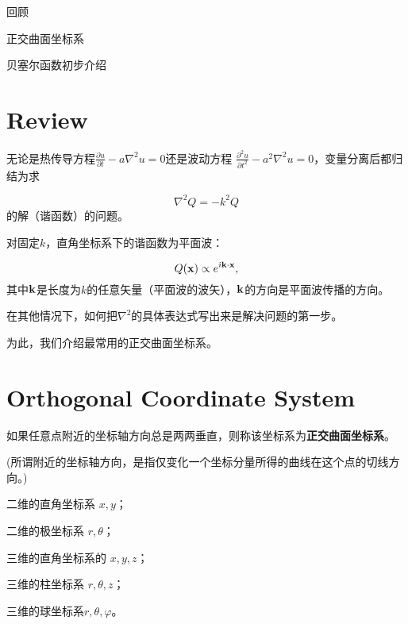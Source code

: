 \documentclass[CJK]{beamer}
\date{}
\begin{document}

\begin{frame}
\bch
\bitem
\item{回顾}
\item{正交曲面坐标系}
\item{贝塞尔函数初步介绍}    
\eitem
\ech
\end{frame}

\section{Review}


\begin{frame}
\bch
无论是热传导方程$\frac{\partial u}{\partial t} -a \nabla^2u = 0$还是波动方程
$\frac{\partial^2u }{\partial t^2} - a^2 \nabla^2 u = 0$，变量分离后都归结为求

$$ \nabla^2 Q = - k ^2 Q $$
的解（谐函数）的问题。

\ech
\end{frame}


\begin{frame}
\bch
对固定$k$，直角坐标系下的谐函数为平面波：

$$Q({\mathbf{x}}) \propto e^{{\dot{\imath}} {\mathbf{k}}\cdot {\mathbf{x}}}, $$
其中${\mathbf{k}}$是长度为$k$的任意矢量（平面波的波矢），${\mathbf{k}}$的方向是平面波传播的方向。
\ech
\end{frame}


\begin{frame}
\bch
在其他情况下，如何把$\nabla^2$的具体表达式写出来是解决问题的第一步。

\skiplines

为此，我们介绍最常用的正交曲面坐标系。
\ech
\end{frame}


\section{Orthogonal Coordinate System}



\begin{frame}
\bch
如果任意点附近的坐标轴方向总是两两垂直，则称该坐标系为{\blue \bf 正交曲面坐标系}。

\skiplines
(所谓附近的坐标轴方向，是指仅变化一个坐标分量所得的曲线在这个点的切线方向。)

\skiplines
\bex
二维的直角坐标系 $x, y$；

二维的极坐标系 $r, \theta$；

三维的直角坐标系的 $x, y, z$；

三维的柱坐标系 $r, \theta, z$；

三维的球坐标系$ r, \theta, \varphi$。
\eex
\ech
\end{frame}
\end{document}
